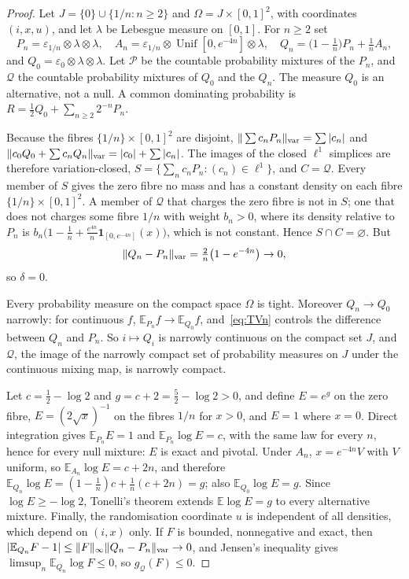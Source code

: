 \documentclass[11pt,a4paper]{article}
\theoremstyle{definition}
\theoremstyle{remark}
\newcommand{\PP}{\mathcal P}
\newcommand{\QQ}{\mathcal Q}
\newcommand{\EE}{\mathbb E}
\newcommand{\one}{\mathbf 1}
\newcommand{\Unif}{\operatorname{Unif}}
\newcommand{\pt}{\varepsilon}
\begin{document}
\begin{proof}
Let \(J=\{0\}\cup\{1/n:n\ge2\}\) and \(\Omega=J\times[0,1]^2\), with coordinates \((i,x,u)\), and let \(\lambda\) be Lebesgue measure on \([0,1]\). For \(n\ge2\) set
\[
 P_n=\pt_{1/n}\otimes\lambda\otimes\lambda,\quad
 A_n=\pt_{1/n}\otimes\Unif[0,e^{-4n}]\otimes\lambda,\quad
 Q_n=\bigl(1-\tfrac1n\bigr)P_n+\tfrac1nA_n,
\]
and \(Q_0=\pt_0\otimes\lambda\otimes\lambda\). Let \(\PP\) be the countable probability mixtures of the \(P_n\), and \(\QQ\) the countable probability mixtures of \(Q_0\) and the \(Q_n\). The measure \(Q_0\) is an alternative, not a null. A common dominating probability is \(R=\frac12Q_0+\sum_{n\ge2}2^{-n}P_n\).

Because the fibres \(\{1/n\}\times[0,1]^2\) are disjoint, \(\|\sum c_nP_n\|_{\rm var}=\sum|c_n|\) and \(\|c_0Q_0+\sum c_nQ_n\|_{\rm var}=|c_0|+\sum|c_n|\). The images of the closed \(\ell^1\) simplices are therefore variation-closed, \(S=\{\sum_nc_nP_n:(c_n)\in\ell^1\}\), and \(C=\QQ\). Every member of \(S\) gives the zero fibre no mass and has a constant density on each fibre \(\{1/n\}\times[0,1]^2\). A member of \(\QQ\) that charges the zero fibre is not in \(S\); one that does not charges some fibre \(1/n\) with weight \(b_n>0\), where its density relative to \(P_n\) is \(b_n\bigl(1-\frac1n+\frac{e^{4n}}n\one_{[0,e^{-4n}]}(x)\bigr)\), which is not constant. Hence \(S\cap C=\varnothing\). But
\begin{equation}\label{eq:TVn}
 \|Q_n-P_n\|_{\rm var}=\tfrac2n\bigl(1-e^{-4n}\bigr)\to0,
\end{equation}
so \(\delta=0\).

Every probability measure on the compact space \(\Omega\) is tight. Moreover \(Q_n\to Q_0\) narrowly: for continuous \(f\), \(\EE_{P_n}f\to\EE_{Q_0}f\), and~\eqref{eq:TVn} controls the difference between \(Q_n\) and \(P_n\). So \(i\mapsto Q_i\) is narrowly continuous on the compact set \(J\), and \(\QQ\), the image of the narrowly compact set of probability measures on \(J\) under the continuous mixing map, is narrowly compact.

Let \(c=\frac12-\log2\) and \(g=c+2=\frac52-\log2>0\), and define \(E=e^g\) on the zero fibre, \(E=(2\sqrt x)^{-1}\) on the fibres \(1/n\) for \(x>0\), and \(E=1\) where \(x=0\). Direct integration gives \(\EE_{P_n}E=1\) and \(\EE_{P_n}\log E=c\), with the same law for every \(n\), hence for every null mixture: \(E\) is exact and pivotal. Under \(A_n\), \(x=e^{-4n}V\) with \(V\) uniform, so \(\EE_{A_n}\log E=c+2n\), and therefore \(\EE_{Q_n}\log E=(1-\frac1n)c+\frac1n(c+2n)=g\); also \(\EE_{Q_0}\log E=g\). Since \(\log E\ge-\log2\), Tonelli's theorem extends \(\EE\log E=g\) to every alternative mixture. Finally, the randomisation coordinate \(u\) is independent of all densities, which depend on \((i,x)\) only. If \(F\) is bounded, nonnegative and exact, then \(|\EE_{Q_n}F-1|\le\|F\|_\infty\|Q_n-P_n\|_{\rm var}\to0\), and Jensen's inequality gives \(\limsup_n\EE_{Q_n}\log F\le0\), so \(g_{\QQ}(F)\le0\).
\end{proof}
\end{document}
